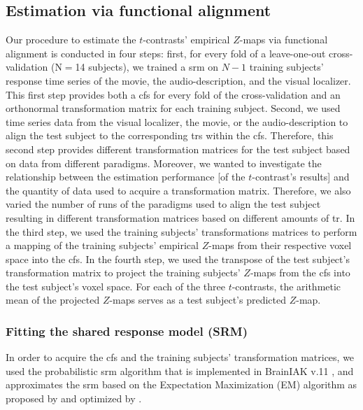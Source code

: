 \subsection{Estimation via functional alignment}
%
Our procedure to estimate the $t$-contrasts' empirical $Z$-maps via functional
alignment is conducted in four steps:
first, for every fold of a leave-one-out cross-validation (N$=$14 subjects), we
trained a \ac{srm} on $N-1$ training subjects' response time series
of the movie, the audio-description, and the visual localizer.
This first step provides both a \ac{cfs} for every fold of the cross-validation
and an orthonormal transformation matrix for each training subject.
Second, we used time series data from the visual localizer, the movie, or the
audio-description to align the test subject to the corresponding \acp{tr} within
the \ac{cfs}.
%
Therefore, this second step provides different transformation matrices for the
test subject based on data from different paradigms.
Moreover, we wanted to investigate the relationship between the estimation
performance [of the $t$-contrast's results] and the quantity of data used to
acquire a transformation matrix.
Therefore, we also varied the number of runs of the paradigms used to align the
test subject resulting in different transformation matrices based on different
amounts of \ac{tr}.
In the third step, we used the training subjects' transformations matrices to
perform a mapping of the training subjects' empirical $Z$-maps from their
respective voxel space into the \ac{cfs}.
In the fourth step, we used the transpose of the test subject's transformation
matrix to project the training subjects' $Z$-maps from the \ac{cfs} into the
test subject's voxel space.
For each of the three $t$-contrasts, the arithmetic mean of the projected
$Z$-maps serves as a test subject's predicted $Z$-map.



\subsubsection{Fitting the shared response model (SRM)}

%
In order to acquire the \ac{cfs} and the training subjects' transformation
matrices, we used the probabilistic \ac{srm} algorithm that is implemented in
BrainIAK v.11 \citep[Brain Imaging Analysis Kit;][]{kumar2020brainiak,
kumar2020brainiaktutorial}, and approximates the \ac{srm} based on the
Expectation Maximization (EM) algorithm as proposed by \citet{chen2015reduced}
and optimized by \citet{anderson2016enabling}.


